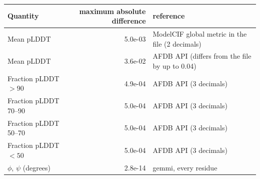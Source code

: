 \begin{tabular}{lrl}
\toprule
Quantity & maximum absolute difference & reference \\
\midrule
Mean pLDDT & 5.0e-03 & ModelCIF global metric in the file (2 decimals) \\
Mean pLDDT & 3.6e-02 & AFDB API (differs from the file by up to 0.04) \\
Fraction pLDDT $>90$ & 4.9e-04 & AFDB API (3 decimals) \\
Fraction pLDDT 70--90 & 5.0e-04 & AFDB API (3 decimals) \\
Fraction pLDDT 50--70 & 5.0e-04 & AFDB API (3 decimals) \\
Fraction pLDDT $<50$ & 5.0e-04 & AFDB API (3 decimals) \\
$\phi$, $\psi$ (degrees) & 2.8e-14 & gemmi, every residue \\
\bottomrule
\end{tabular}
